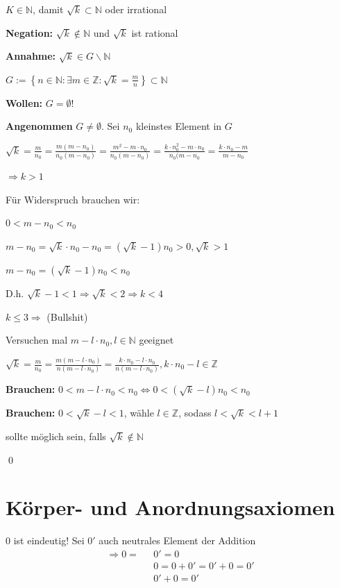\documentclass[fleqn]{scrbook}
\renewenvironment{proof}{{\bfseries Beweis }}{\qed}
\newenvironment{example}{{\bfseries Beispiel }}{}
\begin{document}
$K \in \mathbb{N}$, damit $\sqrt{k} \subset \mathbb{N}$ oder irrational

\begin{proof}

\textbf{Negation:} $\sqrt{k} \notin \mathbb{N}$ und $\sqrt{k}$ ist rational

\textbf{Annahme:} $\sqrt{k} \in G \backslash \mathbb{N}$

$G:=\left\{ n \in \mathbb{N}: \exists m \in \mathbb{Z}: \sqrt{k} = \frac{m}{n} \right\} \subset \mathbb{N}$

\textbf{Wollen:} $G = \emptyset$!

\textbf{Angenommen} $G \neq \emptyset$. Sei $n_0$ kleinstes Element in $G$

$\sqrt{k} = \frac{m}{n_0} = \frac{m(m-n_0)}{n_0(m-n_0)} = \frac{m^2-m \cdot n_0}{n_0(m-n_0)} = \frac{k \cdot n_0^2-m \cdot n_0}{n_0(m-n_0} = \frac{k \cdot n_0-m}{m-n_0}$ 

$\Longrightarrow k>1$

Für Widerspruch brauchen wir:

$0<m-n_0<n_0$

$m-n_0 = \sqrt{k} \cdot n_0-n_0=(\sqrt{k}-1)n_0>0,\sqrt{k}>1$ 

$m-n_0 = (\sqrt{k}-1)n_0 < n_0$

D.h. $\sqrt{k} -1<1 \Longrightarrow \sqrt{k}<2 \Longrightarrow k<4$

$k \leq 3 \Longrightarrow $ (Bullshit)

Versuchen mal $m-l \cdot n_0,l \in \mathbb{N}$ geeignet

$\sqrt{k} = \frac{m}{n_0} = \frac{m(m-l \cdot n_0)}{n(m-l \cdot n_0)} = \frac{k \cdot n_0-l \cdot n_0}{n(m-l \cdot n_0)}, k \cdot n_0-l \in \mathbb{Z}$

\textbf{Brauchen:}  $0<m-l \cdot n_0<n_0 \Longleftrightarrow 0<(\sqrt{k}-l)n_0<n_0$ 

\textbf{Brauchen:}  $0<\sqrt{k}-l<1$, wähle $l \in \mathbb{Z}$, sodass $l < \sqrt{k}<l+1$

sollte möglich sein, falls $\sqrt{k} \notin \mathbb{N}$ 

\end{proof}

\section{Körper- und Anordnungsaxiomen}
  \begin{example}
    $0$ ist eindeutig!
    Sei $0'$ auch neutrales Element der Addition
    \begin{align*}
      \Longrightarrow 0 = \text{ }& 0' = 0\\
                      & 0  = 0+0'=0'+0=0'\\
                      & 0' + 0=0'
    \end{align*}
  \end{example}
\end{document}
